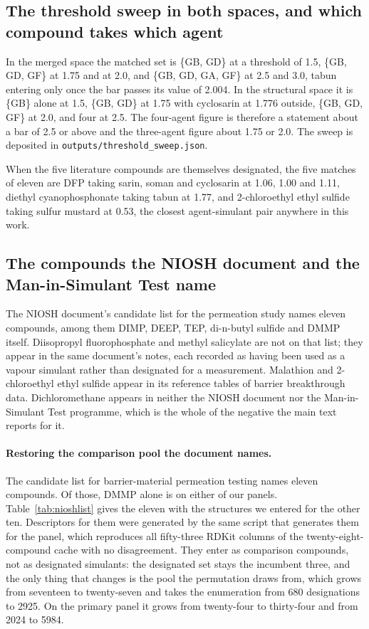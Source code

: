 \documentclass[11pt,a4paper]{article}
\begin{document}
\subsection{The threshold sweep in both spaces, and which compound takes which agent}

In the merged space the matched set is \{GB, GD\} at a threshold of 1.5,
\{GB, GD, GF\} at 1.75 and at 2.0, and \{GB, GD, GA, GF\} at 2.5 and 3.0,
tabun entering only once the bar passes its value of 2.004. In the structural
space it is \{GB\} alone at 1.5, \{GB, GD\} at 1.75 with cyclosarin at 1.776
outside, \{GB, GD, GF\} at 2.0, and four at 2.5. The four-agent figure is
therefore a statement about a bar of 2.5 or above and the three-agent figure
about 1.75 or 2.0. The sweep is deposited in
\texttt{outputs/threshold\_sweep.json}.

When the five literature compounds are themselves designated, the five matches
of eleven are DFP taking sarin, soman and cyclosarin at 1.06, 1.00 and 1.11,
diethyl cyanophosphonate taking tabun at 1.77, and 2-chloroethyl ethyl sulfide
taking sulfur mustard at 0.53, the closest agent-simulant pair anywhere in this
work.

\subsection{The compounds the NIOSH document and the Man-in-Simulant Test name}
\label{meth:niosh}

The NIOSH document's candidate list for the permeation study names eleven
compounds, among them DIMP, DEEP, TEP, di-n-butyl sulfide and DMMP itself.
Diisopropyl fluorophosphate and methyl salicylate are not on that list; they
appear in the same document's notes, each recorded as having been used as a
vapour simulant rather than designated for a measurement. Malathion and
2-chloroethyl ethyl sulfide appear in its reference tables of barrier
breakthrough data. Dichloromethane appears in neither the NIOSH document nor the
Man-in-Simulant Test programme, which is the whole of the negative the main text
reports for it.

\paragraph{Restoring the comparison pool the document names.} The candidate
list for barrier-material permeation testing names eleven compounds. Of those,
DMMP alone is on either of our panels.
Table~\ref{tab:nioshlist} gives the eleven with the structures we entered for
the other ten.
Descriptors for them were generated by the same script that generates them for
the panel, which reproduces all fifty-three RDKit columns of the
twenty-eight-compound cache with no disagreement. They enter as comparison
compounds, not as designated simulants: the designated set stays the incumbent
three, and the only thing that changes is the pool the permutation draws from,
which grows from seventeen to twenty-seven and takes the enumeration from 680
designations to 2925. On the primary panel it grows from twenty-four to
thirty-four and from 2024 to 5984.
\end{document}
